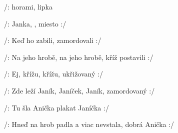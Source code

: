 

\zs
/:  horami,
lipka 

/:  Janka,
, 
miesto  :/
\ks

\zs
/: Keď ho zabili,
zamordovali :/

/: Na jeho hrobě,
na jeho hrobě,
kříž postavili :/
\ks

\zs
/: Ej, křížu, křížu,
ukřižovaný :/

/: Zde leží Janík,
Janíček, Janík,
zamordovaný :/
\ks

\zs
/: Tu šla Anička
plakat Janíčka :/

/: Hneď na hrob padla
a viac nevstala,
dobrá Anička :/
\ks

\kp







